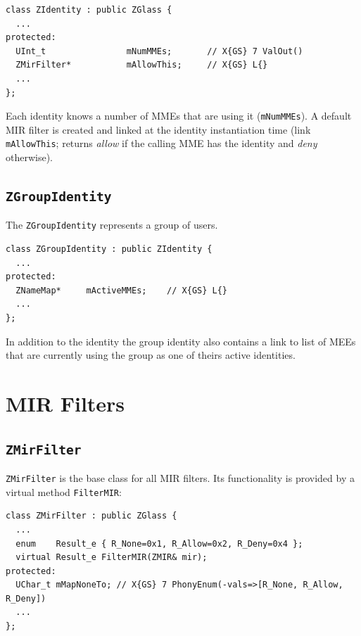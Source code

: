 \documentclass[a4paper,11pt]{article}
\def\smalltt#1{{\small\texttt{#1}}}
\begin{document}
{\footnotesize\begin{verbatim}
class ZIdentity : public ZGlass {
  ...
protected:
  UInt_t                mNumMMEs;       // X{GS} 7 ValOut()
  ZMirFilter*           mAllowThis;     // X{GS} L{}
  ...
};
\end{verbatim}
}

Each identity knows a number of MMEs that are using it
(\smalltt{mNumMMEs}). A default MIR filter is created and linked at
the identity instantiation time (link \smalltt{mAllowThis};
returns \emph{allow} if the calling MME has the identity and
\emph{deny} otherwise).

\subsection{\texttt{ZGroupIdentity}}

The \texttt{ZGroupIdentity} represents a group of users.

{\footnotesize\begin{verbatim}
class ZGroupIdentity : public ZIdentity {
  ...
protected:
  ZNameMap*     mActiveMMEs;    // X{GS} L{}
  ...
};
\end{verbatim}
}

In addition to the identity the group identity also contains a link to
list of MEEs that are currently using the group as one of theirs active
identities.


\section{MIR Filters}
\label{sec:MIR_Filters}

\subsection{\texttt{ZMirFilter}}

\texttt{ZMirFilter} is the base class for all MIR filters.  Its
functionality is provided by a virtual method \smalltt{FilterMIR}:

{\footnotesize\begin{verbatim}
class ZMirFilter : public ZGlass {
  ...
  enum    Result_e { R_None=0x1, R_Allow=0x2, R_Deny=0x4 };
  virtual Result_e FilterMIR(ZMIR& mir);
protected:
  UChar_t mMapNoneTo; // X{GS} 7 PhonyEnum(-vals=>[R_None, R_Allow, R_Deny])
  ...
};
\end{verbatim}
}
    
\end{document}
